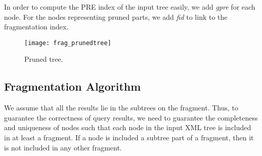 In order to compute the PRE index of the input tree easily, we add \emph{gpre}
for each node. For the nodes representing pruned parts, we add \emph{fid} to
link to the fragmentation index.

\begin{figure}[t]  
	\centering
	\texttt{[image: frag\_prunedtree]}
	\caption{Pruned tree.}
	\label{fig:frag_prunedtree}	
\end{figure}


\subsection{Fragmentation Algorithm}

We assume that all the results lie in the subtrees on the fragment. Thus, to
guarantee the correctness of query results, we need to guarantee the
completeness and uniqueness of nodes such that each node in the input XML tree
is included in at least a fragment. If a node is included a subtree part of a
fragment, then it is not included in any other fragment. 

